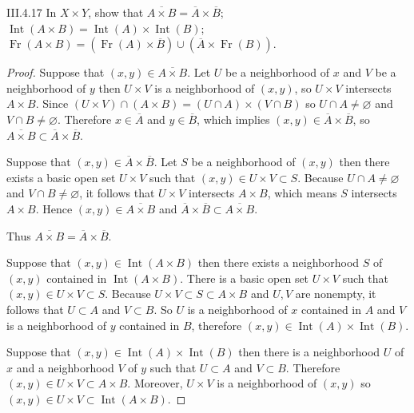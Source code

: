 \begin{problem}{III.4.17}
In \(X\times Y\), show that \( \overline{A \times B} = \overline{A} \times \overline{B} \); \( \operatorname{Int}(A \times B) = \operatorname{Int}(A) \times \operatorname{Int}(B) \); \( \operatorname{Fr}(A \times B) = (\operatorname{Fr}(A) \times \overline{B}) \cup (\overline{A} \times \operatorname{Fr}(B)) \).
\end{problem}

\begin{proof}
	Suppose that \( (x, y) \in \overline{A \times B} \). Let \( U \) be a neighborhood of \(x\) and \(V\) be a neighborhood of \(y\) then \( U \times V \) is a neighborhood of \( (x, y) \), so \( U \times V \) intersects \( A \times B \). Since \( (U \times V) \cap (A \times B) = (U \cap A) \times (V \cap B) \) so \( U \cap A \ne \varnothing \) and \( V \cap B \ne \varnothing \). Therefore \( x \in \overline{A} \) and \( y \in \overline{B} \), which implies \( (x, y) \in \overline{A} \times \overline{B} \), so \( \overline{A \times B} \subset \overline{A} \times \overline{B} \).

	Suppose that \( (x, y) \in \overline{A} \times \overline{B} \). Let \( S \) be a neighborhood of \( (x, y) \) then there exists a basic open set \( U \times V \) such that \( (x, y) \in U \times V \subset S \). Because \( U \cap A \ne \varnothing \) and \( V \cap B \ne \varnothing \), it follows that \( U \times V \) intersects \( A \times B \), which means \( S \) intersects \( A \times B \). Hence \( (x, y) \in \overline{A \times B} \) and \( \overline{A} \times \overline{B} \subset \overline{A \times B} \).

	Thus \( \overline{A \times B} = \overline{A} \times \overline{B} \).

	\hrulefill%

	Suppose that \( (x, y) \in \operatorname{Int}(A\times B) \) then there exists a neighborhood \(S\) of \( (x, y) \) contained in \( \operatorname{Int}(A\times B) \). There is a basic open set \( U\times V \) such that \( (x, y) \in U \times V \subset S \). Because \( U \times V \subset S \subset A \times B \) and \( U, V \) are nonempty, it follows that \( U \subset A \) and \( V \subset B \). So \( U \) is a neighborhood of \( x \) contained in \( A \) and \( V \) is a neighborhood of \(y\) contained in \(B\), therefore \( (x, y) \in \operatorname{Int}(A) \times \operatorname{Int}(B) \).

	Suppose that \( (x, y) \in \operatorname{Int}(A) \times \operatorname{Int}(B) \) then there is a neighborhood \(U\) of \(x\) and a neighborhood \(V\) of \(y\) such that \( U \subset A \) and \( V \subset B \). Therefore \( (x, y) \in U\times V \subset A\times B \). Moreover, \( U\times V \) is a neighborhood of \( (x, y) \) so \( (x, y) \in U \times V \subset \operatorname{Int}(A \times B) \).


\end{proof}
